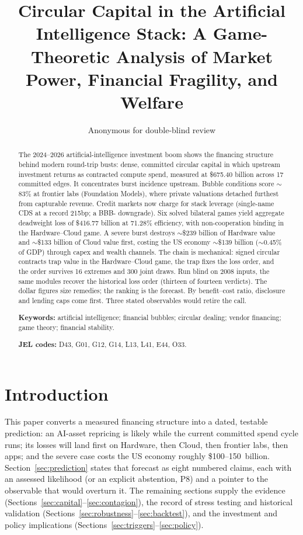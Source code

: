 \documentclass[11pt,a4paper]{article}
\title{Circular Capital in the Artificial Intelligence Stack:
A Game-Theoretic Analysis of Market Power, Financial Fragility, and Welfare}
\author{Anonymous for double-blind review}
\date{}
\begin{document}
\maketitle
\begin{abstract}
\noindent The 2024--2026 artificial-intelligence investment boom shows the
financing structure behind modern round-trip busts: dense,
committed circular capital in which upstream investment returns
as contracted compute spend, measured at \$675.40 billion across 17
committed edges. It concentrates burst incidence upstream.
Bubble conditions score $\sim$83\% at frontier labs (Foundation Models),
where private valuations detached furthest from capturable revenue.
Credit markets now charge for stack leverage (single-name CDS
at a record 215bp; a BBB- downgrade). Six solved bilateral games
yield aggregate deadweight loss of \$416.77 billion
at 71.28\% efficiency, with non-cooperation binding in the Hardware--Cloud
game. A severe burst destroys $\sim$\$239 billion of Hardware value and
$\sim$\$133 billion of Cloud value first, costing the US economy
$\sim$\$139 billion ($\sim$0.45\% of GDP) through capex and wealth channels.
The chain is mechanical: signed circular contracts trap value in the
Hardware--Cloud game, the trap fixes the loss order, and the order survives
16 extremes and 300 joint draws. Run blind on 2008
inputs, the same modules recover the historical loss order
(thirteen of fourteen verdicts). The dollar figures size remedies;
the ranking is the forecast. By benefit--cost ratio,
disclosure and lending caps come first. Three stated observables would retire
the call.
\medskip

\noindent\textbf{Keywords:} artificial intelligence; financial bubbles;
circular dealing; vendor financing; game theory; financial stability.
\medskip

\noindent\textbf{JEL codes:} D43, G01, G12, G14, L13, L41, E44, O33.
\end{abstract}

\section{Introduction}
This paper converts a measured financing structure into a dated,
testable prediction: an AI-asset repricing is likely while the current
committed spend cycle runs; its losses will land first on Hardware, then
Cloud, then frontier labs, then apps; and the severe case costs the US
economy roughly \$100--150~billion. Section~\ref{sec:prediction} states
that forecast as eight numbered claims, each with an assessed likelihood
(or an explicit abstention, P8) and a pointer to the observable that would
overturn it. The remaining
sections supply the evidence (Sections~\ref{sec:capital}--\ref{sec:contagion}),
the record of stress testing and historical validation
(Sections~\ref{sec:robustness}--\ref{sec:backtest}), and the investment and
policy implications (Sections~\ref{sec:triggers}--\ref{sec:policy}).
\end{document}
